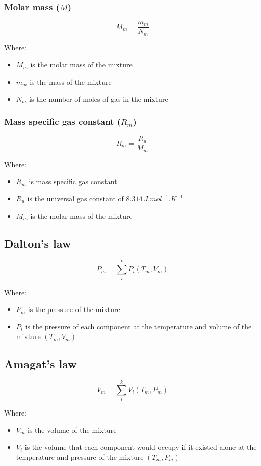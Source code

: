 \documentclass[11pt]{article}
\begin{document}
\subsubsection{Molar mass (\(M\))}
\label{sec:orgcf0e1f9}
\[M_m = \frac{m_m}{N_m}\]

Where:
\begin{itemize}
\item \(M_m\) is the molar mass of the mixture
\item \(m_m\) is the mass of the mixture
\item \(N_m\) is the number of moles of gas in the mixture
\end{itemize}

\subsubsection{Mass specific gas constant (\(R_m\))}
\label{sec:orgc2d7b61}
\[R_m = \frac{R_u}{M_m}\]

Where:
\begin{itemize}
\item \(R_m\) is mass specific gas constant
\item \(R_u\) is the universal gas constant of \(\qty{8.314}{J.mol^{-1}.K^{-1}}\)
\item \(M_m\) is the molar mass of the mixture
\end{itemize}

\subsection{Dalton's law}
\label{sec:org7a6055e}
\[P_m = \sum_i^k P_i (T_m, V_m)\]

Where:
\begin{itemize}
\item \(P_m\) is the pressure of the mixture
\item \(P_i\) is the pressure of each component at the temperature and volume of the mixture \((T_m, V_m)\)
\end{itemize}

\subsection{Amagat's law}
\label{sec:org691fded}
\[V_m = \sum_i^k V_i (T_m, P_m)\]

Where:
\begin{itemize}
\item \(V_m\) is the volume of the mixture
\item \(V_i\) is the volume that each component would occupy if it existed alone at the temperature and pressure of the mixture \((T_m, P_m)\)
\end{itemize}
\end{document}
